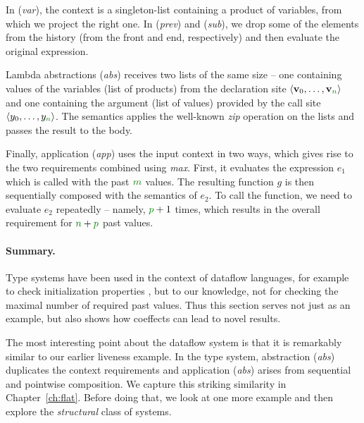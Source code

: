 In (\emph{var}), the context is a singleton-list containing a product of variables, from which
we project the right one. In (\emph{prev}) and (\emph{sub}), we drop some of the elements from
the history (from the front and end, respectively) and then evaluate the original expression.

Lambda abstractions (\emph{abs}) receives two lists of the same size -- one containing values of
the variables (list of products) from the declaration site $\langle \mathbf{v}_0, \ldots, \mathbf{v}_{\cclrd{n}} \rangle$
and one containing the argument (list of values) provided by the call site $\langle y_0, \ldots, y_{\cclrd{n}} \rangle$.
The semantics applies the well-known \emph{zip} operation on the lists and passes the result to the
body.

Finally, application (\emph{app}) uses the input context in two ways, which gives rise to the
two requirements combined using \emph{max}. First, it evaluates the expression $e_1$ which is
called with the past $\cclrd{m}$ values. The resulting function $g$ is then sequentially composed
with the semantics of $e_2$. To call the function, we need to evaluate $e_2$ repeatedly -- namely,
$\cclrd{p}+1$ times, which results in the overall requirement for $\cclrd{n}+\cclrd{p}$ past values.

\paragraph{Summary.}
Type systems have been used in the context of dataflow languages, for example to check
initialization properties \cite{app-dataflow-init}, but to our knowledge, not for checking
the maximal number of required past values. Thus this section serves not just as an example,
but also shows how coeffects can lead to novel results.

The most interesting point about the dataflow system is that it is remarkably similar to our
earlier liveness example. In the type system, abstraction (\emph{abs}) duplicates the context
requirements and application (\emph{abs}) arises from sequential and pointwise composition.
We capture this striking similarity in Chapter~\ref{ch:flat}. Before doing that, we look at one
more example and then explore the \emph{structural} class of systems.



